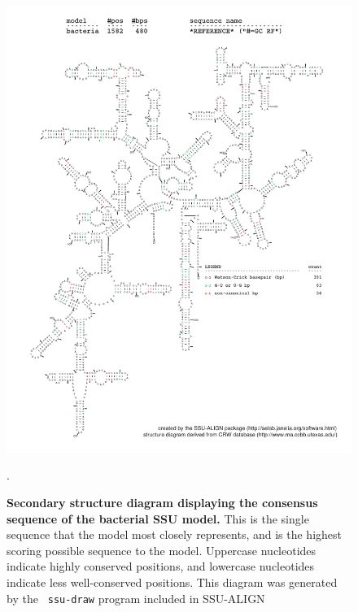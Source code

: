 \begin{figure}
\begin{center}
\includegraphics[width=5.64in]{Figures/bacteria-0p1-rf}
\end{center}
\caption[Secondary structure diagram displaying the consensus sequence
  of the bacterial SSU model]{\textbf{Secondary structure diagram displaying the
  consensus sequence of the bacterial SSU model.} 
  This is the single sequence that the model 
  most closely represents, and is the highest scoring possible
  sequence to the model. Uppercase nucleotides indicate highly conserved positions,
  and lowercase nucleotides indicate less well-conserved positions.
  This diagram was generated by the {\tt
  ssu-draw} program included in SSU-ALIGN}.
\label{fig:bacrf}
\end{figure}

\newpage 

